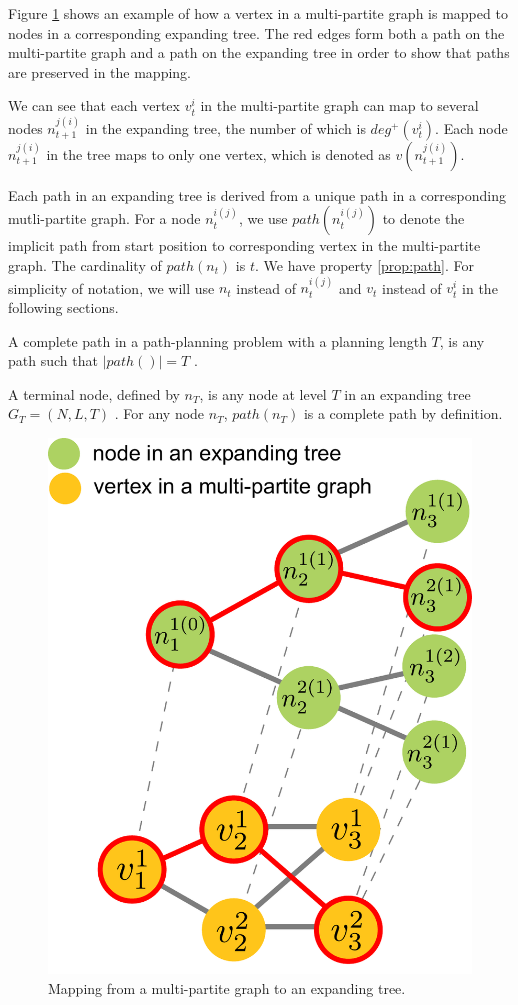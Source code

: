 \documentclass[12pt]{article}
\begin{document}
Figure \ref{fig:multipartite_expandingtree} shows an example of how a vertex in a multi-partite graph is mapped to nodes in a corresponding expanding tree. The red edges form both a path on the multi-partite graph and a path on the expanding tree in order to show that paths are preserved in the mapping. 

We can see that each vertex $ v^{i}_{t} $ in the multi-partite graph can map to several nodes $ n^{j(i)}_{t+1} $ in the expanding tree, the number of which is $ deg^{+}(v^{i}_{t})$. Each node $ n^{j(i)}_{t+1} $ in the tree maps to only one vertex, which is denoted as $ v(n^{j(i)}_{t+1}) $.

Each path in an expanding tree is derived from a unique path in a corresponding mutli-partite graph.
For a node $ n_{t}^{i(j)} $, we use $ path(n_{t}^{i(j)}) $ to denote the implicit path from start position to corresponding vertex in the multi-partite graph.
The cardinality of $ path(n_{t}) $ is $ t $.
We have property \ref{prop:path}.
For simplicity of notation, we will use $ n_{t} $ instead of $ n_{t}^{i(j)} $ and $ v_{t} $ instead of $ v_{t}^{i} $ in the following sections. 

\begin{mydef}
\label{def:complete_path}
A complete path in a path-planning problem with a planning length $ T $, is any path such that
$ | path() | = T  $ .
\end{mydef}

\begin{mydef}
\label{def:terminal_node}
A terminal node, defined by $ n_{T} $, is any node at level $ T $ in an expanding tree $ G_{T} = (N, L, T) $ . 
For any node $ n_{T} $, $ path(n_{T}) $ is a complete path by definition.
\end{mydef}

\begin{figure}
\centering
\includegraphics[width=0.4\linewidth]{./images/multipartite_expandingtree.pdf}
\caption{Mapping from a multi-partite graph to an expanding tree.}
\label{fig:multipartite_expandingtree}
\end{figure}
\end{document}
